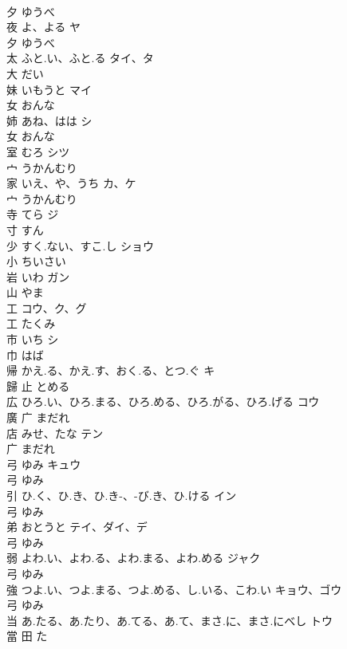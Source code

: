 \documentclass[8pt]{extreport}
\begin{document}
\begin{CJK}{UTF8}{min}
\\	夕		ゆうべ		
\\	夜	よ、よる	ヤ	
\\	夕		ゆうべ		
\\	太	ふと.い、ふと.る	タイ、タ	
\\	大		だい		
\\	妹	いもうと	マイ	
\\	女		おんな		
\\	姉	あね、はは	シ	
\\	女		おんな		
\\	室	むろ	シツ	
\\	宀		うかんむり		
\\	家	いえ、や、うち	カ、ケ	
\\	宀		うかんむり		
\\	寺	てら	ジ	
\\	寸		すん		
\\	少	すく.ない、すこ.し	ショウ	
\\	小		ちいさい		
\\	岩	いわ	ガン	
\\	山		やま		
\\	工		コウ、ク、グ	
\\	工		たくみ		
\\	市	いち	シ	
\\	巾		はば		
\\	帰	かえ.る、かえ.す、おく.る、とつ.ぐ	キ	
\\	歸	止		とめる		
\\	広	ひろ.い、ひろ.まる、ひろ.める、ひろ.がる、ひろ.げる	コウ	
\\	廣	广		まだれ		
\\	店	みせ、たな	テン	
\\	广		まだれ		
\\	弓	ゆみ	キュウ	
\\	弓		ゆみ		
\\	引	ひ.く、ひ.き、ひ.き-、-び.き、ひ.ける	イン	
\\	弓		ゆみ		
\\	弟	おとうと	テイ、ダイ、デ	
\\	弓		ゆみ		
\\	弱	よわ.い、よわ.る、よわ.まる、よわ.める	ジャク	
\\	弓		ゆみ		
\\	強	つよ.い、つよ.まる、つよ.める、し.いる、こわ.い	キョウ、ゴウ	
\\	弓		ゆみ		
\\	当	あ.たる、あ.たり、あ.てる、あ.て、まさ.に、まさ.にべし	トウ	
\\	當	田		た		

\end{CJK}
\end{document}
